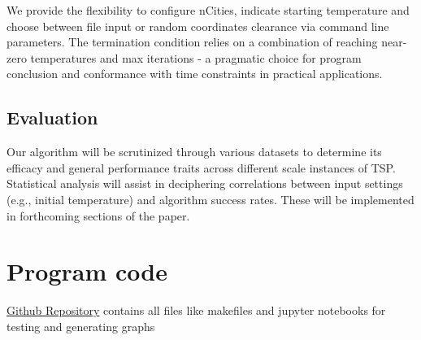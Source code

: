 \documentclass[a4paper,10pt]{article}
\begin{document}
We provide the flexibility to configure nCities, indicate starting temperature and choose between file input or random coordinates clearance via command line parameters. The termination condition relies on a combination of reaching near-zero temperatures and max iterations - a pragmatic choice for program conclusion and conformance with time constraints in practical applications.

\subsection{Evaluation}

Our algorithm will be scrutinized through various datasets to determine its efficacy and general performance traits across different scale instances of TSP. Statistical analysis will assist in deciphering correlations between input settings (e.g., initial temperature) and algorithm success rates. These will be implemented in forthcoming sections of the paper.



\section{Program code}

 \href{https://github.com/Daiigr/TSPSA-ICS}{Github Repository} 
 contains all files like makefiles and jupyter notebooks for testing and generating graphs
\end{document}
